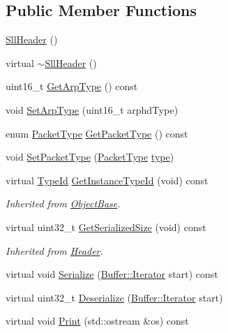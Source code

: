 \subsection*{Public Member Functions}
\begin{DoxyCompactItemize}
\item 
\hyperlink{classns3_1_1SllHeader_aef3924963b07cd323a6e42fed7569d50}{Sll\+Header} ()
\item 
virtual \hyperlink{classns3_1_1SllHeader_a42222902d33eeec4491336d24aa7c285}{$\sim$\+Sll\+Header} ()
\item 
uint16\+\_\+t \hyperlink{classns3_1_1SllHeader_af3f1c76207c7e0bf7f8aa9b25284f6b7}{Get\+Arp\+Type} () const 
\item 
void \hyperlink{classns3_1_1SllHeader_a3a68e38c1ad4897ec894a21ac0af4e39}{Set\+Arp\+Type} (uint16\+\_\+t arphd\+Type)
\item 
enum \hyperlink{classns3_1_1SllHeader_a82af509915aa0f97f81f806f2286937c}{Packet\+Type} \hyperlink{classns3_1_1SllHeader_a0b16b86f6a75d6e4e9e75b848e0776c8}{Get\+Packet\+Type} () const 
\item 
void \hyperlink{classns3_1_1SllHeader_ac7a30781dd42aad8a2298e042ffc7456}{Set\+Packet\+Type} (\hyperlink{classns3_1_1SllHeader_a82af509915aa0f97f81f806f2286937c}{Packet\+Type} \hyperlink{visualizer-ideas_8txt_add98db9e15e2a58cf2b57623e7aa893a}{type})
\item 
virtual \hyperlink{classns3_1_1TypeId}{Type\+Id} \hyperlink{classns3_1_1SllHeader_af6429f099b2a30aaa13a01c95b2972b4}{Get\+Instance\+Type\+Id} (void) const 
\begin{DoxyCompactList}\small\item\em Inherited from \hyperlink{classns3_1_1ObjectBase}{Object\+Base}. \end{DoxyCompactList}\item 
virtual uint32\+\_\+t \hyperlink{classns3_1_1SllHeader_a6bfdc51f3f4c36ead454bfbe990be51e}{Get\+Serialized\+Size} (void) const 
\begin{DoxyCompactList}\small\item\em Inherited from \hyperlink{classns3_1_1Header}{Header}. \end{DoxyCompactList}\item 
virtual void \hyperlink{classns3_1_1SllHeader_a42de41d9084c82c6337f3b5ff831a4ca}{Serialize} (\hyperlink{classns3_1_1Buffer_1_1Iterator}{Buffer\+::\+Iterator} start) const 
\item 
virtual uint32\+\_\+t \hyperlink{classns3_1_1SllHeader_a924106369babbd6774828c26e1cec054}{Deserialize} (\hyperlink{classns3_1_1Buffer_1_1Iterator}{Buffer\+::\+Iterator} start)
\item 
virtual void \hyperlink{classns3_1_1SllHeader_a1e4148c4b66c0e1a19469cf8e0633548}{Print} (std\+::ostream \&os) const 
\end{DoxyCompactItemize}
